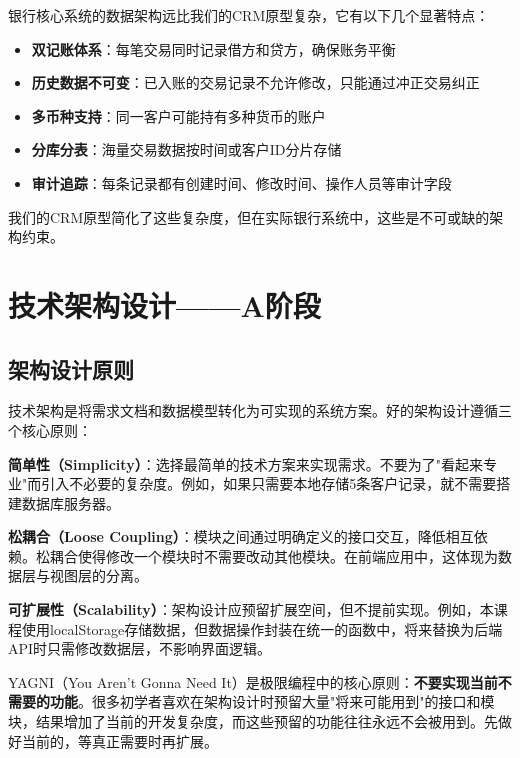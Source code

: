\begin{theorybox}[银行核心系统的数据架构特点]
银行核心系统的数据架构远比我们的CRM原型复杂，它有以下几个显著特点：
\begin{itemize}[leftmargin=2em]
  \item \textbf{双记账体系}：每笔交易同时记录借方和贷方，确保账务平衡
  \item \textbf{历史数据不可变}：已入账的交易记录不允许修改，只能通过冲正交易纠正
  \item \textbf{多币种支持}：同一客户可能持有多种货币的账户
  \item \textbf{分库分表}：海量交易数据按时间或客户ID分片存储
  \item \textbf{审计追踪}：每条记录都有创建时间、修改时间、操作人员等审计字段
\end{itemize}
我们的CRM原型简化了这些复杂度，但在实际银行系统中，这些是不可或缺的架构约束。
\end{theorybox}

\section{技术架构设计——A阶段}

\subsection{架构设计原则}

技术架构是将需求文档和数据模型转化为可实现的系统方案。好的架构设计遵循三个核心原则：

\textbf{简单性（Simplicity）}：选择最简单的技术方案来实现需求。不要为了"看起来专业"而引入不必要的复杂度。例如，如果只需要本地存储5条客户记录，就不需要搭建数据库服务器。

\textbf{松耦合（Loose Coupling）}：模块之间通过明确定义的接口交互，降低相互依赖。松耦合使得修改一个模块时不需要改动其他模块。在前端应用中，这体现为数据层与视图层的分离。

\textbf{可扩展性（Scalability）}：架构设计应预留扩展空间，但不提前实现。例如，本课程使用localStorage存储数据，但数据操作封装在统一的函数中，将来替换为后端API时只需修改数据层，不影响界面逻辑。

\begin{notebox}[YAGNI原则]
YAGNI（You Aren't Gonna Need It）是极限编程中的核心原则：\textbf{不要实现当前不需要的功能}。很多初学者喜欢在架构设计时预留大量"将来可能用到"的接口和模块，结果增加了当前的开发复杂度，而这些预留的功能往往永远不会被用到。先做好当前的，等真正需要时再扩展。
\end{notebox}

